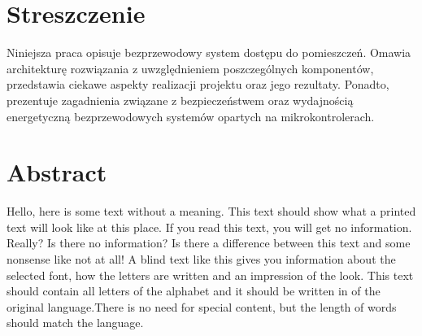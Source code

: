 \section*{Streszczenie}
Niniejsza praca opisuje bezprzewodowy system dostępu do pomieszczeń. Omawia
architekturę rozwiązania z uwzględnieniem poszczególnych komponentów, przedstawia
ciekawe aspekty realizacji projektu oraz jego rezultaty. Ponadto, prezentuje
zagadnienia związane z bezpieczeństwem oraz wydajnością energetyczną bezprzewodowych systemów opartych na
mikrokontrolerach.

\section*{Abstract}
Hello, here is some text without a meaning.  This text should show what
a printed text will look like at this place.  If you read this text,
you will get no information.  Really?  Is there no information?  Is there
a difference between this text and some nonsense like not at all!  A
blind text like this gives you information about the selected font, how
the letters are written and an impression of the look.  This text should
contain all letters of the alphabet and it should be written in of the
original language.There is no need for special content, but the length of
words should match the language.